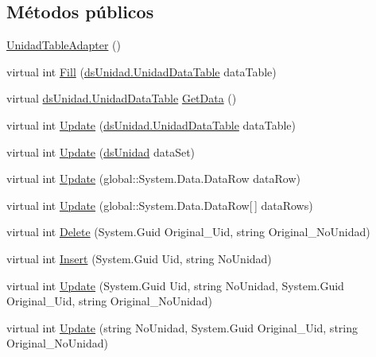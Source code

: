 \subsection*{Métodos públicos}
\begin{DoxyCompactItemize}
\item 
\hyperlink{class_proyecto___integrador__3_1_1ds_unidad_table_adapters_1_1_unidad_table_adapter_acd553f95bf3151af8b6b4b877dab67e5}{Unidad\-Table\-Adapter} ()
\item 
virtual int \hyperlink{class_proyecto___integrador__3_1_1ds_unidad_table_adapters_1_1_unidad_table_adapter_a9b4cd452e334a4f1c9b587bc7d955f21}{Fill} (\hyperlink{class_proyecto___integrador__3_1_1ds_unidad_1_1_unidad_data_table}{ds\-Unidad.\-Unidad\-Data\-Table} data\-Table)
\item 
virtual \hyperlink{class_proyecto___integrador__3_1_1ds_unidad_1_1_unidad_data_table}{ds\-Unidad.\-Unidad\-Data\-Table} \hyperlink{class_proyecto___integrador__3_1_1ds_unidad_table_adapters_1_1_unidad_table_adapter_aa6880a92e220af9c45d78c8ad17a2b93}{Get\-Data} ()
\item 
virtual int \hyperlink{class_proyecto___integrador__3_1_1ds_unidad_table_adapters_1_1_unidad_table_adapter_ab66b8ee5e1153ac309331e6234ba7fad}{Update} (\hyperlink{class_proyecto___integrador__3_1_1ds_unidad_1_1_unidad_data_table}{ds\-Unidad.\-Unidad\-Data\-Table} data\-Table)
\item 
virtual int \hyperlink{class_proyecto___integrador__3_1_1ds_unidad_table_adapters_1_1_unidad_table_adapter_a5a943cac3ec30c6fa91b0059b8af7413}{Update} (\hyperlink{class_proyecto___integrador__3_1_1ds_unidad}{ds\-Unidad} data\-Set)
\item 
virtual int \hyperlink{class_proyecto___integrador__3_1_1ds_unidad_table_adapters_1_1_unidad_table_adapter_ae1789a516a249268c6230d4c71e45bd3}{Update} (global\-::\-System.\-Data.\-Data\-Row data\-Row)
\item 
virtual int \hyperlink{class_proyecto___integrador__3_1_1ds_unidad_table_adapters_1_1_unidad_table_adapter_a8008a1cbe0e208e9a6a582a950b93249}{Update} (global\-::\-System.\-Data.\-Data\-Row\mbox{[}$\,$\mbox{]} data\-Rows)
\item 
virtual int \hyperlink{class_proyecto___integrador__3_1_1ds_unidad_table_adapters_1_1_unidad_table_adapter_aa7acce7d136cd2115babbff7d95992f9}{Delete} (System.\-Guid Original\-\_\-\-Uid, string Original\-\_\-\-No\-Unidad)
\item 
virtual int \hyperlink{class_proyecto___integrador__3_1_1ds_unidad_table_adapters_1_1_unidad_table_adapter_ae9b51295d2db0d2f844a63f10ddd6346}{Insert} (System.\-Guid Uid, string No\-Unidad)
\item 
virtual int \hyperlink{class_proyecto___integrador__3_1_1ds_unidad_table_adapters_1_1_unidad_table_adapter_abfebbd44695319d75cd6ffaa8c3570fa}{Update} (System.\-Guid Uid, string No\-Unidad, System.\-Guid Original\-\_\-\-Uid, string Original\-\_\-\-No\-Unidad)
\item 
virtual int \hyperlink{class_proyecto___integrador__3_1_1ds_unidad_table_adapters_1_1_unidad_table_adapter_a9234374de0d3fa62b8c390465c024415}{Update} (string No\-Unidad, System.\-Guid Original\-\_\-\-Uid, string Original\-\_\-\-No\-Unidad)
\end{DoxyCompactItemize}
